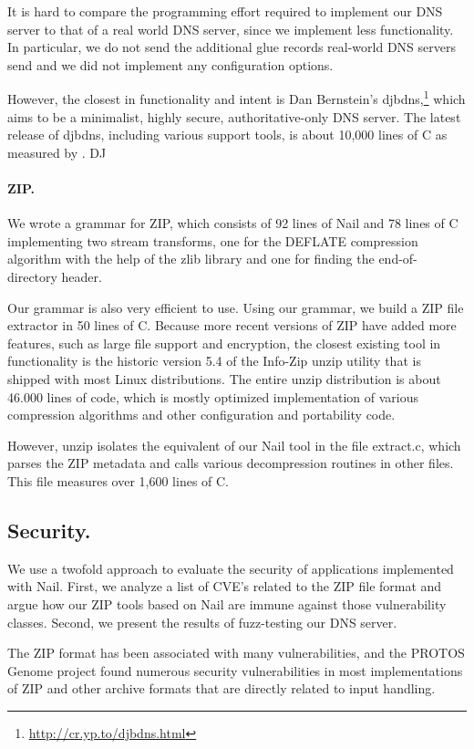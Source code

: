 It is hard to compare the programming effort required to implement
our DNS server to that of a real world DNS server, since we implement less functionality.
 In particular, we do not send the additional glue records real-world DNS servers send and
we did not implement any configuration options.

However, the closest in functionality and intent is Dan Bernstein's
djbdns,\footnote{\url{http://cr.yp.to/djbdns.html}} which aims to be a minimalist, highly secure,
authoritative-only DNS server. The latest release of djbdns, including various support tools, is
about 10,000 lines of C as measured by . DJ

\paragraph{ZIP.}


We wrote a grammar for ZIP, which consists of 92 lines of Nail and 78 lines of C implementing two
stream transforms, one for the DEFLATE compression algorithm with the help of the zlib library and
one for finding the end-of-directory header. 

Our grammar is also very efficient to use. Using our grammar, we build a ZIP file extractor in 50
lines of C. Because more recent versions of ZIP have added more features, such as large file support
and encryption, the closest existing tool in functionality is the historic version 5.4 of the Info-Zip unzip
utility\cite{infozip} that is shipped with most Linux distributions. The entire unzip distribution
is about 46.000 lines of code, which is mostly optimized implementation of various compression
algorithms and other configuration and portability code.

However, unzip isolates the equivalent of our Nail tool in the file extract.c, which parses the ZIP
metadata and calls various decompression routines in other files. This file measures over 1,600
lines of C. 

\subsection{Security.} 
We use a twofold approach to evaluate the security of applications implemented with Nail. First, we
analyze a list of CVE's related to the ZIP file format and argue how our ZIP tools based on Nail are
immune against those vulnerability classes. Second, we present the results of fuzz-testing our DNS
server.

The ZIP format has been associated with many vulnerabilities, and the PROTOS Genome project found numerous
security vulnerabilities in most implementations of ZIP and other archive formats that are directly
related to input handling.

